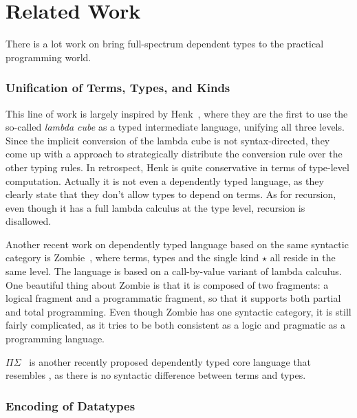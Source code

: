 \section{Related Work}

There is a lot work on bring full-spectrum dependent types to the practical programming world.

\subsubsection{Unification of Terms, Types, and Kinds}

This line of work is largely inspired by Henk~\cite{pts:henk}, where they are the first to use the so-called \emph{lambda cube} as a typed intermediate language, unifying all three levels. Since the implicit conversion of the lambda cube is not syntax-directed, they come up with a approach to strategically distribute the conversion rule over the other typing rules. In retrospect, Henk is quite conservative in terms of type-level computation. Actually it is not even a dependently typed language, as they clearly state that they don't allow types to depend on terms. As for recursion, even though it has a full lambda calculus at the type level, recursion is disallowed.

Another recent work on dependently typed language based on the same syntactic category is \textsf{Zombie}~\cite{zombie:popl14, zombie:thesis}, where terms, types and the single kind $\star$ all reside in the same level. The language is based on a call-by-value variant of lambda calculus. One beautiful thing about Zombie is that it is composed of two fragments: a logical fragment and a programmatic fragment, so that it supports both partial and total programming. Even though Zombie has one syntactic category, it is still fairly complicated, as it tries to be both consistent as a logic and pragmatic as a programming language.

$\Pi\Sigma$~\cite{dep:pisigma} is another recently proposed dependently typed core language that resembles \name, as there is no syntactic difference between terms and types.

\subsubsection{Encoding of Datatypes}

